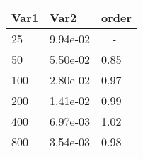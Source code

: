 \begin{tabular}{lll}
Var1 & Var2 & order \\ 
\hline 
25 & 9.94e-02 & ---- \\ 
50 & 5.50e-02 & 0.85 \\ 
100 & 2.80e-02 & 0.97 \\ 
200 & 1.41e-02 & 0.99 \\ 
400 & 6.97e-03 & 1.02 \\ 
800 & 3.54e-03 & 0.98 \\ 
\hline 
\end{tabular}